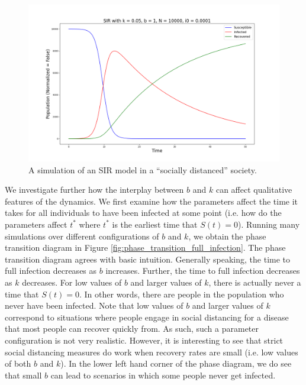 \documentclass[12pt, reqno]{amsart}
\begin{document}
    \begin{figure}
        \centering
        \includegraphics[scale=0.8]{sir_ode_simulation1.png}
        \caption{A simulation of an SIR model in a ``socially distanced'' society.}
        \label{fig:simulation1}
    \end{figure}

    We investigate further how the interplay between \(b\) and \(k\) can affect qualitative features of the dynamics. We first examine how the parameters affect the time it takes for all individuals to have been infected at some point (i.e. how do the parameters affect \(t^*\) where \(t^*\) is the earliest time that \(S(t) = 0\)). Running many simulations over different configurations of \(b\) and \(k\), we obtain the phase transition diagram in Figure \ref{fig:phase_transition_full_infection}. The phase transition diagram agrees with basic intuition. Generally speaking, the time to full infection decreases as \(b\) increases. Further, the time to full infection decreases as \(k\) decreases. For low values of \(b\) and larger values of \(k\), there is actually never a time that \(S(t) = 0\). In other words, there are people in the population who never have been infected. Note that low values of \(b\) and larger values of \(k\) correspond to situations where people engage in social distancing for a disease that most people can recover quickly from. As such, such a parameter configuration is not very realistic. However, it is interesting to see that strict social distancing measures do work when recovery rates are small (i.e. low values of both \(b\) and \(k\)). In the lower left hand corner of the phase diagram, we do see that small \(b\) can lead to scenarios in which some people never get infected.
\end{document}
